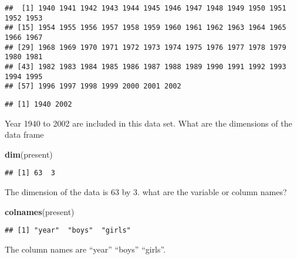 \documentclass[]{article}
\newenvironment{Shaded}{\begin{snugshade}}{\end{snugshade}}
\newcommand{\KeywordTok}[1]{\textcolor[rgb]{0.13,0.29,0.53}{\textbf{#1}}}
\newcommand{\OperatorTok}[1]{\textcolor[rgb]{0.81,0.36,0.00}{\textbf{#1}}}
\newcommand{\NormalTok}[1]{#1}
\begin{document}
\begin{Shaded}
\end{Shaded}

\begin{verbatim}
##  [1] 1940 1941 1942 1943 1944 1945 1946 1947 1948 1949 1950 1951 1952 1953
## [15] 1954 1955 1956 1957 1958 1959 1960 1961 1962 1963 1964 1965 1966 1967
## [29] 1968 1969 1970 1971 1972 1973 1974 1975 1976 1977 1978 1979 1980 1981
## [43] 1982 1983 1984 1985 1986 1987 1988 1989 1990 1991 1992 1993 1994 1995
## [57] 1996 1997 1998 1999 2000 2001 2002
\end{verbatim}

\begin{Shaded}
\end{Shaded}

\begin{verbatim}
## [1] 1940 2002
\end{verbatim}

Year 1940 to 2002 are included in this data set. What are the dimensions
of the data frame

\begin{Shaded}
\begin{Highlighting}[]
\KeywordTok{dim}\NormalTok{(present)}
\end{Highlighting}
\end{Shaded}

\begin{verbatim}
## [1] 63  3
\end{verbatim}

The dimension of the data is 63 by 3. what are the variable or column
names?

\begin{Shaded}
\begin{Highlighting}[]
\KeywordTok{colnames}\NormalTok{(present)}
\end{Highlighting}
\end{Shaded}

\begin{verbatim}
## [1] "year"  "boys"  "girls"
\end{verbatim}

The column names are ``year'' ``boys'' ``girls''.
\end{document}
